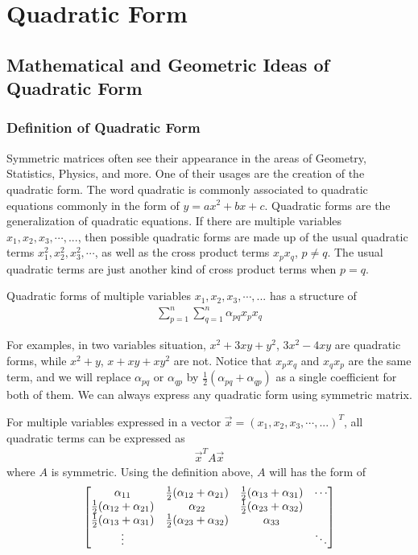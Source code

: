 \chapter{Quadratic Form}

\section{Mathematical and Geometric Ideas of Quadratic Form}
\subsection{Definition of Quadratic Form}

Symmetric matrices often see their appearance in the areas of Geometry, Statistics, Physics, and more. One of their usages are the creation of the quadratic form. The word quadratic is commonly associated to quadratic equations commonly in the form of $y = ax^2 + bx + c$. Quadratic forms are the generalization of quadratic equations. If there are multiple variables $x_1, x_2, x_3, \cdots, ...$, then possible quadratic forms are made up of the usual quadratic terms $x_1^2, x_2^2, x_3^2, \cdots$, as well as the cross product terms $x_px_q$, $p \neq q$. The usual quadratic terms are just another kind of cross product terms when $p = q$.
\begin{defn}
\label{quadform}
Quadratic forms of multiple variables $x_1, x_2, x_3, \cdots, ...$ has a structure of
\begin{align*}
\sum_{p=1}^{n}\sum_{q=1}^{n} \alpha_{pq} x_px_q
\end{align*}
\end{defn}
For examples, in two variables situation, $x^2 + 3xy + y^2$, $3x^2 - 4xy$ are quadratic forms, while $x^2 + y$, $x + xy + xy^2$ are not. Notice that $x_px_q$ and $x_qx_p$ are the same term, and we will replace $\alpha_{pq}$ or $\alpha_{qp}$ by $\frac{1}{2}(\alpha_{pq} + \alpha_{qp})$ as a single coefficient for both of them. We can always express any quadratic form using symmetric matrix. 
\begin{proper}
For multiple variables expressed in a vector $\vec{x} = (x_1, x_2, x_3, \cdots, ...)^T$, all quadratic terms can be expressed as
\begin{align*}
\vec{x}^TA\vec{x}
\end{align*}
where $A$ is symmetric. Using the definition above, $A$ will has the form of
\begin{align*}
\left[\begin{array}{@{}cccc@{}}
\alpha_{11} & \frac{1}{2}(\alpha_{12} + \alpha_{21}) & \frac{1}{2}(\alpha_{13} + \alpha_{31}) & \cdots \\
\frac{1}{2}(\alpha_{12} + \alpha_{21}) & \alpha_{22} & \frac{1}{2}(\alpha_{23} + \alpha_{32}) &  \\
\frac{1}{2}(\alpha_{13} + \alpha_{31}) & \frac{1}{2}(\alpha_{23} + \alpha_{32}) & \alpha_{33} &  \\
\vdots & & & \ddots
\end{array}\right]
\end{align*}
\end{proper}
